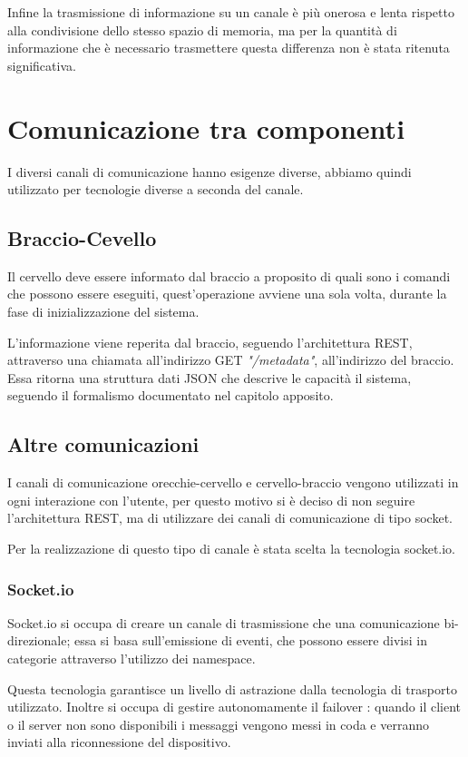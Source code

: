 \documentclass[twoside]{supsistudent}
\begin{document}
Infine la trasmissione di informazione su un canale è più onerosa e lenta rispetto alla condivisione dello stesso spazio di memoria, ma per la quantità di informazione che è necessario trasmettere questa differenza non è stata ritenuta significativa.

\chapter{Comunicazione tra componenti}
I diversi canali di comunicazione hanno esigenze diverse, abbiamo quindi utilizzato per tecnologie diverse a seconda del canale.
\section{Braccio-Cevello}
Il cervello deve essere informato dal braccio a proposito di quali sono i comandi che possono essere eseguiti, quest'operazione avviene una sola volta, durante la fase di inizializzazione del sistema.

L'informazione viene reperita dal braccio, seguendo l'architettura REST, attraverso una chiamata all'indirizzo GET \textit{"/metadata"}, all'indirizzo del braccio. Essa ritorna una struttura dati JSON che descrive le capacità il sistema, seguendo il formalismo documentato nel capitolo apposito.
\section{Altre comunicazioni}
I canali di comunicazione orecchie-cervello e cervello-braccio vengono utilizzati in ogni interazione con l'utente, per questo motivo si è deciso di non seguire l'architettura REST, ma di utilizzare dei canali di comunicazione di tipo socket.

Per la realizzazione di questo tipo di canale è stata scelta la tecnologia socket.io. 
\subsection{Socket.io}
Socket.io si occupa di creare un canale di trasmissione che una comunicazione bi-direzionale; essa si basa sull'emissione di eventi, che possono essere divisi in categorie attraverso l'utilizzo dei namespace.

Questa tecnologia garantisce un livello di astrazione dalla tecnologia di trasporto utilizzato. Inoltre si occupa di gestire autonomamente il failover : quando il client o il server non sono disponibili i messaggi vengono messi in coda e verranno inviati alla riconnessione del dispositivo.
\end{document}
